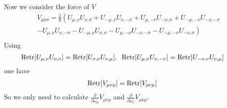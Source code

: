 Now we consider the force of $V$
\begin{equation}
\begin{split}
&V_{\mu\nu\sigma}=\frac{1}{8}\left(U_{\mu,\nu}U_{\nu,\sigma}+U_{-\mu,\nu}U_{\nu,-\sigma}+U_{\mu,-\nu}U_{-\nu,\sigma}+U_{-\mu,-\nu}U_{-\nu,-\sigma}\right.\\
&\left.-U_{\mu,\nu}U_{\nu,-\sigma}-U_{-\mu,\nu}U_{\nu,\sigma}-U_{\mu,-\nu}U_{-\nu,-\sigma}-U_{-\mu,-\nu}U_{-\nu,\sigma}\right)\\
\end{split}
\end{equation}
Using
\begin{equation}
\begin{split}
&{\rm Retr}[U_{\mu,\nu}U_{\nu,\sigma}]={\rm Retr}[U_{\sigma,\nu}U_{\nu,\mu}],\;\;{\rm Retr}[U_{\mu,\nu}U_{\nu,-\sigma}]={\rm Retr}[U_{-\sigma,\nu}U_{\nu,\mu}]
\end{split}
\end{equation}
one have
\begin{equation}
\begin{split}
&{\rm Retr}[V_{\mu\nu\rho}]={\rm Retr}[V_{\rho\nu\mu}]
\end{split}
\end{equation}
So we only need to calculate $\frac{\partial }{\partial \omega _{\mu}}V_{\mu\nu\rho}$ and $\frac{\partial }{\partial \omega _{\nu}}V_{\mu\nu\rho}$.

